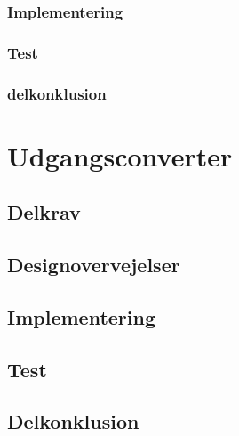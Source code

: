 \documentclass[../main.tex]{subfiles}
\begin{document}
        \subsubsection{Implementering}
        
        \subsubsection{Test}
        
        \subsubsection{delkonklusion}
        
        
\section{Udgangsconverter}

    \subsection{Delkrav}
    
    \subsection{Designovervejelser}
    
    \subsection{Implementering}
    
    \subsection{Test}
    
    \subsection{Delkonklusion}
\end{document}
